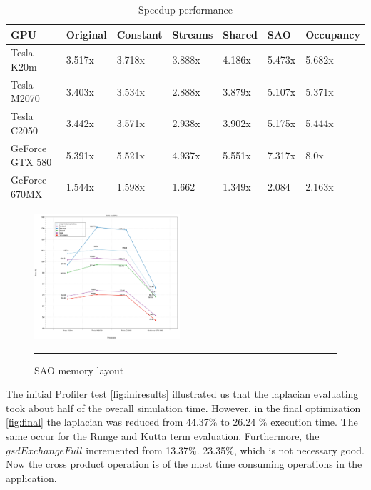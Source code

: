  \begin{table}[h]
\centering
  \begin{tabular} { |  l  |  l | l  |  l  | l | l | l |}
    \hline
    GPU & Original & Constant & Streams & Shared & SAO & Occupancy\\
    \hline
    Tesla K20m & 3.517x & 3.718x & 3.888x & 4.186x & 5.473x & 5.682x\\
   \hline
    Tesla M2070 & 3.403x & 3.534x & 2.888x & 3.879x & 5.107x & 5.371x\\
    \hline
    Tesla C2050 & 3.442x & 3.571x & 2.938x & 3.902x & 5.175x & 5.444x\\
   \hline
    GeForce GTX 580 & 5.391x & 5.521x & 4.937x & 5.551x & 7.317x & 8.0x\\
   \hline
    GeForce 670MX & 1.544x & 1.598x & 1.662 & 1.349x & 2.084 & 2.163x\\
   \hline
  \end{tabular}
    \caption{Speedup performance}
  \label{tab:speed}
  \end{table}

\begin{figure}[htbp]
	\centering
		\includegraphics[width=0.48\textwidth]{Figures/gpuOptimization.png}
		\rule{35em}{0.2pt}
	\caption[Structure of Arrays (SAO)]{SAO memory layout}
	\label{fig:sao}
\end{figure}

The initial Profiler test \ref{fig:iniresults} illustrated us that the laplacian evaluating took about half of the overall simulation time. However, in the final optimization \ref{fig:final} the laplacian was reduced from 44.37$\%$ to 26.24 $\%$ execution time. The same occur for the Runge and Kutta term evaluation. Furthermore, the $gsdExchangeFull$ incremented from 13.37$\%$. 23.35$\%$, which is not necessary good. Now the cross product operation is of the most time consuming operations in the application. 

